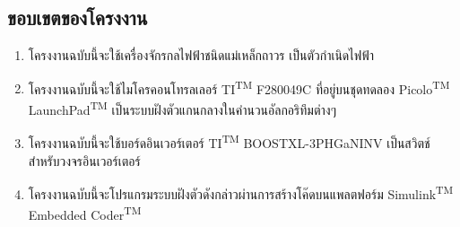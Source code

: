 \documentclass[11pt,a4paper]{article}
\begin{document}

\newpage
\subsection{ขอบเขตของโครงงาน}
\begin{enumerate}
    \item โครงงานฉบับนี้จะใช้เครื่องจักรกลไฟฟ้าชนิดแม่เหล็กถาวร เป็นตัวกำเนิดไฟฟ้า
    \item โครงงานฉบับนี้จะใช้ไมโครคอนโทรลเลอร์ TI\textsuperscript{TM} F280049C ที่อยู่บนชุดทดลอง Picolo\textsuperscript{TM} LaunchPad\textsuperscript{TM} เป็นระบบฝังตัวแกนกลางในคำนวนอัลกอริทึมต่างๆ
    \item โครงงานฉบับนี้จะใช้บอร์ดอินเวอร์เตอร์ TI\textsuperscript{TM} BOOSTXL-3PHGaNINV เป็นสวิตช์สำหรับวงจรอินเวอร์เตอร์
    \item โครงงานฉบับนี้จะโปรแกรมระบบฝังตัวดังกล่าวผ่านการสร้างโค๊ดบนแพลตฟอร์ม Simulink\textsuperscript{TM} Embedded Coder\textsuperscript{TM}
\end{enumerate}


\end{document}
